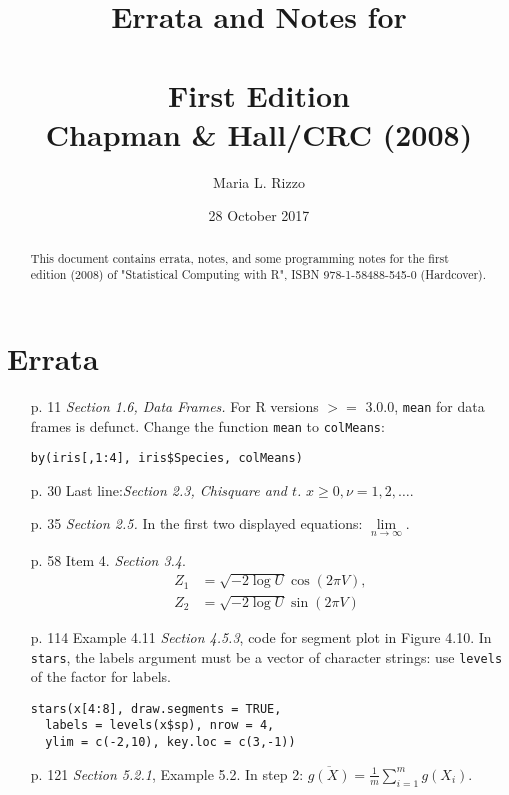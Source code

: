 \documentclass{article}
\title{Errata and Notes for  \\
\emph{\sc{Statistical Computing with R}}\\
First Edition\\
Chapman \& Hall/CRC (2008)}
\author{Maria L. Rizzo}
\date{28 October 2017}
\begin{document}
\maketitle%

\begin{abstract}
\noindent This document contains errata, notes, and some programming notes
for the first edition (2008) of "Statistical Computing with R", ISBN 978-1-58488-545-0
(Hardcover). 
\end{abstract}


\section{Errata}

\begin{enumerate}
\item[p. 11] \emph{Section 1.6, Data Frames.} 
For R versions $>=$ 3.0.0, \texttt{mean} for data frames is defunct.
Change the function \texttt{mean} to \texttt{colMeans}:
\begin{verbatim}
by(iris[,1:4], iris$Species, colMeans)
\end{verbatim}

\item[p. 30]Last line:\emph{Section 2.3, Chisquare and $t$.} 
$x \geq 0, \nu=1,2,\dots$.


\item[p. 35]\emph{Section 2.5.} In the first two displayed equations: $\lim\limits_{n
\to \infty}$.


\item[p. 58] Item 4. \emph{Section 3.4}.
\begin{align*}
Z_1 &= \sqrt{-2 \log U} \cos(2 \pi V),\\
Z_2 &= \sqrt{-2 \log U} \sin(2 \pi V)
\end{align*}


\item[p. 114]Example 4.11 \emph{Section 4.5.3}, code for segment plot in Figure 4.10. 
In \texttt{stars}, the labels argument must be a vector of character strings: use \texttt{levels} of the factor for labels.
\begin{verbatim}
stars(x[4:8], draw.segments = TRUE,
  labels = levels(x$sp), nrow = 4,
  ylim = c(-2,10), key.loc = c(3,-1))
\end{verbatim}

\item[p. 121] \emph{Section 5.2.1}, Example 5.2.
In step 2: $\overline{g(X)}=\frac 1m \sum_{i=1}^m g(X_i)$.


\end{enumerate}
\end{document}

